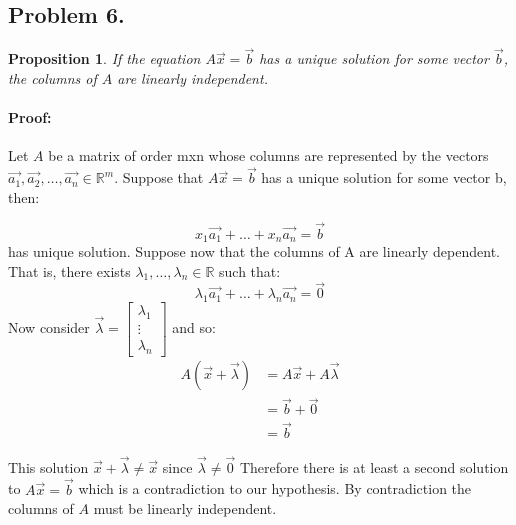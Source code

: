 \documentclass[12pt, letterpaper]{article}
\newcommand{\R}{\mathbb{R}}
\theoremstyle{statement}
\newtheorem*{atmProp}{Proposition}
\newenvironment{atmProof}{\noindent\ignorespaces\paragraph{Proof:}}{\hfill \ding{122}\par\noindent}
\begin{document}
    \subsection*{Problem 6.}
    \begin{atmProp}
    If the equation $A\vec{x}=\vec{b}$ has a unique solution for some vector $\vec{b}$, the columns of $A$ are linearly independent.
    \end{atmProp}
    \begin{atmProof}
    Let $A$ be a matrix of order mxn whose columns are represented by the vectors $\vec{a_1}, \vec{a_2}, \dots, \vec{a_n} \in \R^m$. Suppose that $A\vec{x} = \vec{b}$ has a unique solution for some vector b, then:
    
    $$x_1\vec{a_1} + \dots + x_n\vec{a_n} = \vec{b}$$ has unique solution. Suppose now that the columns of A are linearly dependent. That is, there exists $\lambda_1, \dots, \lambda_n \in \R$ such that:
    $$\lambda_1\vec{a_1} + \dots + \lambda_n\vec{a_n} = \vec{0}$$
    Now consider $\vec{\lambda} = \begin{bmatrix} \lambda_1 \\ \vdots \\ \lambda_n \end{bmatrix}$ and so: 
    \begin{align*}
    A(\vec{x} + \vec{\lambda}) & = A\vec{x} + A\vec{\lambda} \\ 
    & = \vec{b} + {\vec{0}} \\ 
    & = \vec{b}
    \end{align*}
    
    This solution $\vec{x} + \vec{\lambda} \neq \vec{x}$ since $\vec{\lambda} \neq \vec{0}$ Therefore there is at least a second solution to $A\vec{x} = \vec{b}$ which is a contradiction to our hypothesis. By contradiction the columns of $A$ must be linearly independent.

    \end{atmProof}
    
\end{document}
